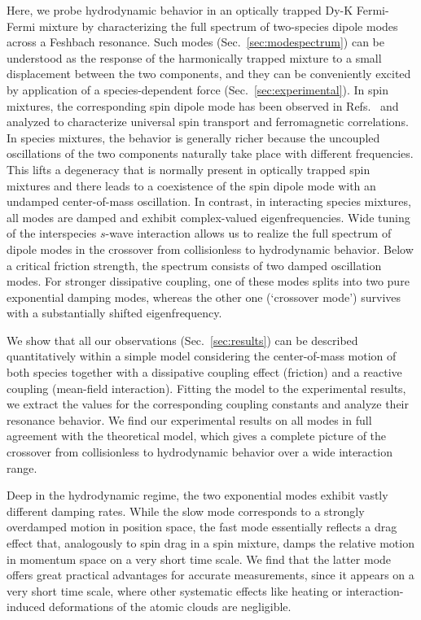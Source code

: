 Here, we probe hydrodynamic behavior in an optically trapped Dy-K Fermi-Fermi mixture by characterizing the full spectrum of {two-species dipole modes} across a Feshbach resonance. Such modes (Sec.~\ref{sec:modespectrum}) can be understood as the response of the harmonically trapped mixture to a small displacement between the two components, and they can be conveniently excited by application of a species-dependent force (Sec.~\ref{sec:experimental}). %
In spin mixtures, the corresponding {spin dipole mode} has been observed in Refs.~\cite{Sommer2011ust, Sommer2011sti, Valtolina2017etf} and analyzed to characterize universal spin transport {and ferromagnetic correlations}. In species mixtures, the behavior is generally richer because the uncoupled oscillations of the two components naturally take place with different frequencies. This lifts a degeneracy that is normally present in optically trapped spin mixtures and there leads to a coexistence of the spin dipole mode with an undamped center-of-mass oscillation. In contrast, in interacting species mixtures, all modes are damped and exhibit complex-valued eigenfrequencies. Wide tuning of the interspecies $s$-wave interaction allows us to realize the full spectrum of dipole modes in the crossover from collisionless to hydrodynamic behavior. Below a critical friction strength, the spectrum consists of two damped oscillation modes. 
For stronger dissipative coupling, one of these modes splits into two pure exponential damping modes, whereas the other one (`crossover mode') survives with a substantially shifted eigenfrequency.

We show that all our observations (Sec.~\ref{sec:results}) can be described quantitatively within a simple model considering the center-of-mass motion of both species together with a dissipative coupling effect (friction) and a reactive coupling (mean-field interaction). Fitting the model to the experimental results, we extract the values for the corresponding coupling constants and analyze their resonance behavior. We find our experimental results on all modes in full agreement with the theoretical model, which gives a complete picture of the crossover from collisionless to hydrodynamic behavior over a wide interaction range.

Deep in the hydrodynamic regime, the two exponential modes exhibit vastly different damping rates. While the slow mode corresponds to a strongly overdamped motion in position space, the fast mode essentially reflects a drag effect that, analogously to spin drag in a spin mixture, damps the relative motion in momentum space on a very short time scale. We find that the latter mode offers great practical advantages for accurate measurements, since it appears on a very short time scale, where other systematic effects like heating or interaction-induced deformations of the atomic clouds are negligible. 

